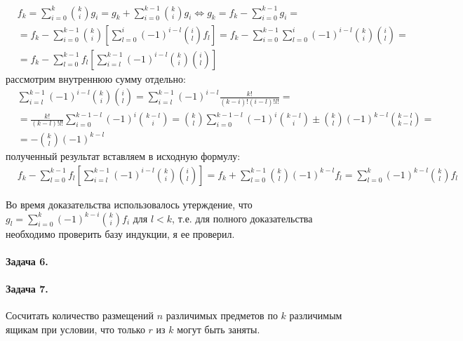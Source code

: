 \documentclass[a4paper,12pt]{article}
\begin{document}
\begin{Solution}
\[
	\begin{split}
		& f_k = \sum_{i=0}^k \binom{k}{i}g_i = g_k + \sum_{i=0}^{k-1} \binom{k}{i}g_i \Leftrightarrow g_k = f_k - \sum_{i=0}^{k-1}g_i = \\
		& = f_k - \sum_{i=0}^{k-1} \binom{k}{i} \left[\sum_{l=0}^i {\left(-1\right)}^{i-l} \binom{i}{l} f_l \right] = f_k - \sum_{i=0}^{k-1}\sum_{l=0}^i {\left(-1\right)}^{i-l} \binom{k}{i}\binom{i}{l} = \\
		& = f_k - \sum_{l=0}^{k-1}f_l \left[\sum_{i=l}^{k-1} {\left(-1\right)}^{i-l} \binom{k}{i} \binom{i}{l}\right]
	\end{split}
\]
рассмотрим внутреннюю сумму отдельно:
\[
	\begin{split}
		& \sum_{i=l}^{k-1} {\left(-1\right)}^{i-l} \binom{k}{i} \binom{i}{l} = \sum_{i=l}^{k-1} {\left(-1\right)}^{i-l} \frac{k!}{\left(k-i\right)!\left(i-l\right)!l!} = \\
		& = \frac{k!}{\left(k-l\right)!l!} \sum_{i=0}^{k-1-l} {\left(-1\right)}^{i} \binom{k-l}{i} = \binom{k}{l}\sum_{i=0}^{k-1-l} {\left(-1\right)}^i \binom{k-l}{i} \pm \binom{k}{l}{\left(-1\right)}^{k-l} \binom{k-l}{k-l} = \\
		& = -\binom{k}{l}{\left(-1\right)}^{k-l}
	\end{split}
\]
полученный результат вставляем в исходную формулу:
\[
	\begin{split}
		& f_k - \sum_{l=0}^{k-1}f_l \left[\sum_{i=l}^{k-1} {\left(-1\right)}^{i-l} \binom{k}{i} \binom{i}{l} \right] = f_k + \sum_{l=0}^{k-1} \binom{k}{l} {\left(-1\right)}^{k-l} f_l = \sum_{l=0}^{k} {\left(-1\right)}^{k-l} \binom{k}{l} f_l
	\end{split}
\]

Во время доказательства использовалось утерждение, что $g_l = \sum_{i=0}^k {\left(-1\right)}^{k-i} \binom{k}{i} f_i$ для $l<k$, т.е. для полного доказательства необходимо проверить базу индукции, я ее проверил.
\end{Solution}

\paragraph{Задача 6.}

\paragraph{Задача 7.} Сосчитать количество размещений $n$ различимых предметов по $k$ различимым ящикам при условии, что только $r$ из $k$ могут быть заняты.
\end{document}
